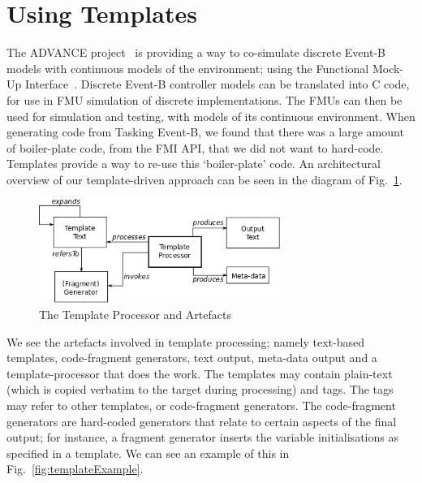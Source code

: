 \documentclass{llncs}%
\begin{document}
\section{Using Templates}\label{templates}
%
The ADVANCE project~\cite{advance} is providing a way to co-simulate discrete Event-B models with continuous models of the environment; using the Functional Mock-Up Interface~\cite{FMISTD}. Discrete Event-B controller models can be translated into C code, for use in FMU simulation of discrete implementations. The FMUs can then be used for simulation and testing, with models of its continuous environment. When generating code from Tasking Event-B, we found that there was a large amount of boiler-plate code, from the FMI API, that we did not want to hard-code. Templates provide a way to re-use this `boiler-plate' code. An architectural overview of our template-driven approach can be seen in the diagram of Fig.~\ref{fig:templates}.
%
\begin{figure}
\centering
\includegraphics[width=0.7\textwidth]{templateOverview.png}
\caption{The Template Processor and Artefacts}
\label{fig:templates}
\end{figure}
%
We see the artefacts involved in template processing; namely text-based templates, code-fragment generators, text output, meta-data output and a template-processor that does the work. The templates may contain plain-text (which is copied verbatim to the target during processing) and tags. The tags may refer to other templates, or code-fragment generators. The code-fragment generators are hard-coded generators that relate to certain aspects of the final output; for instance, a fragment generator inserts the variable initialisations as specified in a template. We can see an example of this in Fig.~\ref{fig:templateExample}. 
%
\end{document}
